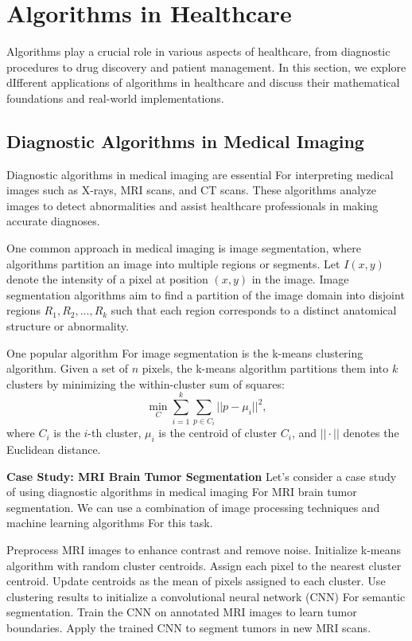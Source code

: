 \documentclass[12pt]{book} %
\begin{document}
\section{Algorithms in Healthcare}
Algorithms play a crucial role in various aspects of healthcare, from diagnostic procedures to drug discovery and patient management. In this section, we explore dIfferent applications of algorithms in healthcare and discuss their mathematical foundations and real-world implementations.

\subsection{Diagnostic Algorithms in Medical Imaging}
Diagnostic algorithms in medical imaging are essential For interpreting medical images such as X-rays, MRI scans, and CT scans. These algorithms analyze images to detect abnormalities and assist healthcare professionals in making accurate diagnoses. 

One common approach in medical imaging is image segmentation, where algorithms partition an image into multiple regions or segments. Let $I(x,y)$ denote the intensity of a pixel at position $(x,y)$ in the image. Image segmentation algorithms aim to find a partition of the image domain into disjoint regions $R_1, R_2, ..., R_k$ such that each region corresponds to a distinct anatomical structure or abnormality.

One popular algorithm For image segmentation is the k-means clustering algorithm. Given a set of $n$ pixels, the k-means algorithm partitions them into $k$ clusters by minimizing the within-cluster sum of squares:
\begin{equation*}
\min_{C} \sum_{i=1}^{k} \sum_{p \in C_i} ||p - \mu_i||^2,
\end{equation*}
where $C_i$ is the $i$-th cluster, $\mu_i$ is the centroid of cluster $C_i$, and $||\cdot||$ denotes the Euclidean distance.

\textbf{Case Study: MRI Brain Tumor Segmentation}
Let's consider a case study of using diagnostic algorithms in medical imaging For MRI brain tumor segmentation. We can use a combination of image processing techniques and machine learning algorithms For this task.
\FloatBarrier
\begin{algorithm}
\caption{MRI Brain Tumor Segmentation}
\begin{algorithmic}[1]
\State Preprocess MRI images to enhance contrast and remove noise.
\State Initialize k-means algorithm with random cluster centroids.
    \State Assign each pixel to the nearest cluster centroid.
    \State Update centroids as the mean of pixels assigned to each cluster.
\EndWhile
\State Use clustering results to initialize a convolutional neural network (CNN) For semantic segmentation.
\State Train the CNN on annotated MRI images to learn tumor boundaries.
\State Apply the trained CNN to segment tumors in new MRI scans.
\end{algorithmic}
\end{algorithm}
\FloatBarrier
\end{document}
